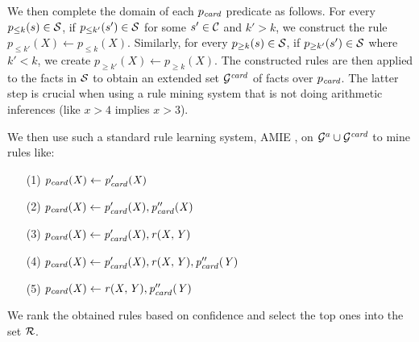 We then complete the domain of each $p_{\mathit{card}}$ predicate as follows. For every $p_{\leq k}(s)\in \mathcal{S}$, if $p_{\leq k'}(s')\in\mathcal{S}$ for some $s'\in \mathcal{C}$ and $k' > k$, we construct the rule $ p_{\leq k'}(X)\leftarrow p_{\leq k}(X).$ Similarly, for every $p_{\geq k}(s)\in\mathcal{S}$, if $p_{\geq k'}(s')\in \mathcal{S}$ where $k' < k$, we create $p_{\geq k'}(X)\leftarrow p_{\geq k}(X)$.
The constructed rules are then applied to the facts in $\mathcal{S}$ to obtain an extended set $\mathcal{G}^{\mathit{card}}$ of facts over $p_{\mathit{card}}$. The latter step is crucial when using a rule mining system that is not doing arithmetic inferences (like $x>4$ implies $x>3$).

 We then use such a standard rule learning system, AMIE \cite{amieplus}, on $\mathcal{G}^a \cup \mathcal{G}^{\mathit{card}}$ to mine rules like:
 
\vspace{-\topsep}
\small{
 \begin{itemize}
\item[(1)] $\mathit{p_{card}(X)\leftarrow p'_{card}(X)}$
\item[(2)] $\mathit{p_{card}(X)\leftarrow p'_{card}(X), p''_{card}(X)}$
\item[(3)] $\mathit{p_{card}(X)\leftarrow p'_{card}(X), r(X,Y)}$
\item[(4)] $\mathit{p_{card}(X)\leftarrow p'_{card}(X), r(X,Y)},\mathit{p''_{card}(Y)}$
\item[(5)] $\mathit{p_{card}(X)\leftarrow r(X,Y), p''_{card}(Y)}$
\end{itemize}
}\normalsize
\vspace{-\topsep}
\noindent We rank the obtained %
rules based on confidence %
and select the top %
ones into the set $\mathcal{R}$.

